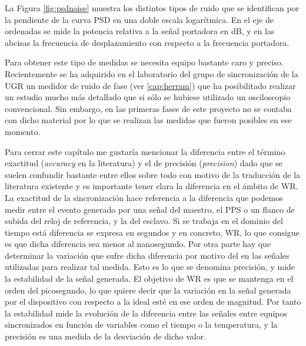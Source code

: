 La Figura \ref{fig:psdnoise} muestra los distintos tipos de ruido que se 
identifican por la pendiente de la curva PSD en una doble escala logarítmica. 
En el eje de ordenadas se mide la potencia relativa a la señal portadora en dB, 
y en las abcisas la frecuencia de desplazamiento con respecto a la frecuencia 
portadora. 

Para obtener este tipo de medidas se necesita equipo bastante caro y preciso. 
Recientemente se ha adquirido en el laboratorio del grupo de sincronización de 
la UGR un medidor de ruido de fase (ver \ref{cap:herram}) que ha posibilitado 
realizar un estudio mucho más detallado que si sólo se hubiese utilizado un 
osciloscopio convencional. Sin embargo, en las primeras fases de este proyecto 
no se contaba con dicho material por lo que se realizan las medidas que fueron 
posibles en ese momento.


Para cerrar este capítulo me gustaría mencionar la diferencia entre el término 
exactitud (\textit{accuracy} en la literatura) y el de precisión 
(\textit{precision}) dado que se suelen confundir bastante entre ellos sobre 
todo con motivo de la traducción de la literatura existente y es importante 
tener clara la diferencia en el ámbito de WR. La exactitud de la sincronización 
hace referencia a la diferencia que podemos medir entre el evento generado por 
una señal del maestro, el PPS o un flanco de subida del reloj de referencia, y 
la del esclavo. Si se trabaja en el dominio del tiempo está diferencia se 
expresa en segundos y en concreto, WR, lo que consigue es que dicha diferencia 
sea menor al nanosegundo. Por otra parte hay que determinar la variación que 
sufre dicha diferencia por motivo del  en las señales utilizadas 
para realizar tal medida. Esto es lo que se denomina precisión, y mide la 
estabilidad de la señal generada. El objetivo de WR es que se mantenga en el 
orden del picosegundo, lo que quiere decir que la variación en la señal 
generada por el dispositivo con respecto a la ideal esté en ese orden de 
magnitud. Por tanto la estabilidad mide la evolución de la diferencia entre las 
señales entre equipos sincronizados en función de variables como el tiempo o la 
temperatura, y la precisión es una medida de la desviación de dicho valor.

